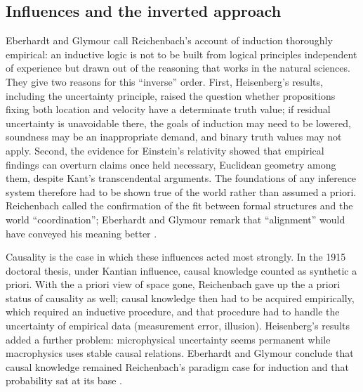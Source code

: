 \subsection{Influences and the inverted approach}
\label{sec:p15-w02b-p15-030-eg-influences}

Eberhardt and Glymour call Reichenbach's account of induction thoroughly
empirical: an inductive logic is not to be built from logical
principles independent of experience but drawn out of the reasoning that
works in the natural sciences. They give two reasons for this
``inverse'' order. First, Heisenberg's results, including the
uncertainty principle, raised the question whether propositions fixing
both location and velocity have a determinate truth value; if residual
uncertainty is unavoidable there, the goals of induction may need to be
lowered, soundness may be an inappropriate demand, and binary truth
values may not apply. Second, the evidence for Einstein's relativity
showed that empirical findings can overturn claims once held necessary,
Euclidean geometry among them, despite Kant's transcendental arguments.
The foundations of any inference system therefore had to be shown true
of the world rather than assumed a priori. Reichenbach called the
confirmation of the fit between formal structures and the world
``coordination''; Eberhardt and Glymour remark that ``alignment'' would have
conveyed his meaning better \cite[pp.~357--358]{EberhardtGlymour2011ReichenbachReading}.

Causality is the case in which these influences acted most strongly.
In the 1915 doctoral thesis, under Kantian influence, causal knowledge
counted as synthetic a priori. With the a priori view of space gone,
Reichenbach gave up the a priori status of causality as well; causal
knowledge then had to be acquired empirically, which required an
inductive procedure, and that procedure had to handle the uncertainty of
empirical data (measurement error, illusion). Heisenberg's results
added a further problem: microphysical uncertainty seems permanent while
macrophysics uses stable causal relations. Eberhardt and Glymour conclude that
causal knowledge remained Reichenbach's paradigm case for induction and
that probability sat at its base
\cite[p.~358]{EberhardtGlymour2011ReichenbachReading}.

